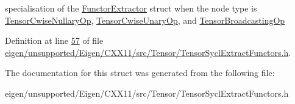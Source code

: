 specialisation of the \hyperlink{struct_eigen_1_1_tensor_sycl_1_1internal_1_1_functor_extractor}{Functor\+Extractor} struct when the node type is \hyperlink{class_eigen_1_1_tensor_cwise_nullary_op}{Tensor\+Cwise\+Nullary\+Op}, \hyperlink{class_eigen_1_1_tensor_cwise_unary_op}{Tensor\+Cwise\+Unary\+Op}, and \hyperlink{class_eigen_1_1_tensor_broadcasting_op}{Tensor\+Broadcasting\+Op} 

Definition at line \hyperlink{eigen_2unsupported_2_eigen_2_c_x_x11_2src_2_tensor_2_tensor_sycl_extract_functors_8h_source_l00057}{57} of file \hyperlink{eigen_2unsupported_2_eigen_2_c_x_x11_2src_2_tensor_2_tensor_sycl_extract_functors_8h_source}{eigen/unsupported/\+Eigen/\+C\+X\+X11/src/\+Tensor/\+Tensor\+Sycl\+Extract\+Functors.\+h}.



The documentation for this struct was generated from the following file\+:\begin{DoxyCompactItemize}
\item 
eigen/unsupported/\+Eigen/\+C\+X\+X11/src/\+Tensor/\+Tensor\+Sycl\+Extract\+Functors.\+h\end{DoxyCompactItemize}
